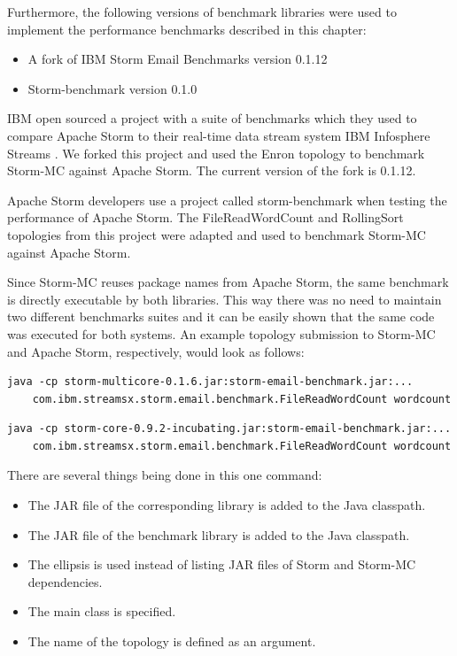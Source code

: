\documentclass[bsc,twoside,singlespacing,normalheadings,parskip]{infthesis}\usepackage[]{graphicx}\usepackage[]{color}
\begin{document}
Furthermore, the following versions of benchmark libraries were used to implement the performance benchmarks described in this chapter:

\begin{itemize}
	\item A fork of IBM Storm Email Benchmarks version 0.1.12
	\item Storm-benchmark version 0.1.0
\end{itemize}

IBM open sourced a project with a suite of benchmarks which they used to compare Apache Storm to their real-time data stream system IBM Infosphere Streams \citep{InfoSphereStreams}. We forked this project and used the Enron topology to benchmark Storm-MC against Apache Storm. The current version of the fork is 0.1.12.

Apache Storm developers use a project called storm-benchmark when testing the performance of Apache Storm. The FileReadWordCount and RollingSort topologies from this project were adapted and used to benchmark Storm-MC against Apache Storm. 

Since Storm-MC reuses package names from Apache Storm, the same benchmark is directly executable by both libraries. This way there was no need to maintain two different benchmarks suites and it can be easily shown that the same code was executed for both systems. An example topology submission to Storm-MC and Apache Storm, respectively, would look as follows:

\begin{verbatim}
java -cp storm-multicore-0.1.6.jar:storm-email-benchmark.jar:...
    com.ibm.streamsx.storm.email.benchmark.FileReadWordCount wordcount
\end{verbatim}
\begin{verbatim}
java -cp storm-core-0.9.2-incubating.jar:storm-email-benchmark.jar:...
    com.ibm.streamsx.storm.email.benchmark.FileReadWordCount wordcount
\end{verbatim}

There are several things being done in this one command:

\begin{itemize}
	\item The JAR file of the corresponding library is added to the Java classpath.
	\item The JAR file of the benchmark library is added to the Java classpath.
	\item The ellipsis is used instead of listing JAR files of Storm and Storm-MC dependencies.
	\item The main class is specified.
	\item The name of the topology is defined as an argument.
\end{itemize}
\end{document}
